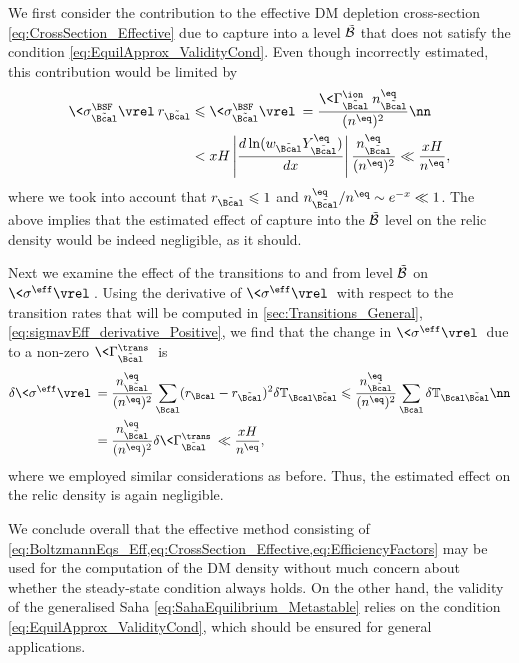 \documentclass[preprint,5p,twocolumn]{elsarticle}
\begin{document}
We first consider the contribution to the effective DM depletion cross-section \eqref{eq:CrossSection_Effective} due to capture into a level $\tilde{{\cal B}}$ that does not satisfy the condition \eqref{eq:EquilApprox_ValidityCond}. 
Even though incorrectly estimated, this contribution would be limited by
%
\begin{align}
\<\sigma_{\tilde{\Bcal}}^{\BSF} \vrel\> r_{\tilde{\Bcal}} 
&\leqslant
\<\sigma_{\tilde{\Bcal}}^{\BSF} \vrel\> =
\dfrac{\<\Gamma_{\tilde{\Bcal}}^{\ion}\> n_{\tilde{\Bcal}}^{\eq}}{(n^{\eq})^2}
\nn \\
&< x H \left|\dfrac{d\ln (w_{\tilde{\Bcal}} Y_{\tilde{\Bcal}}^{\eq}) }{dx} \right| 
\dfrac{n_{\tilde{\Bcal}}^{\eq} }{ (n^{\eq})^2 }
\ll  \dfrac{x H}{ n^{\eq} } ,
\end{align}
%
where we took into account that $r_{\tilde{\Bcal}} \leqslant 1$
and $n_{\tilde{\Bcal}}^{\eq} / n^{\eq} \sim e^{-x} \ll 1$.
The above implies that the estimated effect of capture into the $\tilde{{\cal B}}$ level on the relic density would be indeed negligible, as it should. 

Next we examine the effect of the transitions to and from level $\tilde{\cal B}$ on $\<\sigma^{\eff} \vrel \>$. Using the derivative of $\<\sigma^{\eff} \vrel \>$ with respect to the transition rates that will be computed in \cref{sec:Transitions_General}, \cref{eq:sigmavEff_derivative_Positive}, we find that the change in $\<\sigma^{\eff} \vrel \>$ due to a non-zero $\<\Gamma_{\tilde{\Bcal}}^{\trans} \>$ is 
%
\begin{align}
\delta \<\sigma^{\eff} \vrel\>
&= \dfrac{n_{\tilde{\Bcal}}^{\eq}}{(n^{\eq})^2}    
\sum_{\Bcal} (r_{\Bcal} - r_{\tilde{\Bcal}})^2 
\delta \mathbb{T}_{\Bcal \tilde{\Bcal}}
\leqslant \dfrac{n_{\tilde{\Bcal}}^{\eq}}{(n^{\eq})^2}    
\sum_{\Bcal} \delta \mathbb{T}_{\Bcal \tilde{\Bcal}}
\nn \\
&= \dfrac{n_{\tilde{\Bcal}}^{\eq}}{(n^{\eq})^2}    
\delta \<\Gamma_{\tilde{\Bcal}}^{\trans} \>
\ll \dfrac{xH}{n^{\eq}} ,
\end{align}
%
where we employed similar considerations as before. Thus, the estimated effect on the relic density is again negligible.  


We conclude overall that the effective method consisting of \cref{eq:BoltzmannEqs_Eff,eq:CrossSection_Effective,eq:EfficiencyFactors} may be used for the computation of the DM density without much concern about whether the steady-state condition always holds. On the other hand, the validity of the generalised Saha \cref{eq:SahaEquilibrium_Metastable} relies on the condition \eqref{eq:EquilApprox_ValidityCond}, which should be ensured for general applications.
\end{document}
